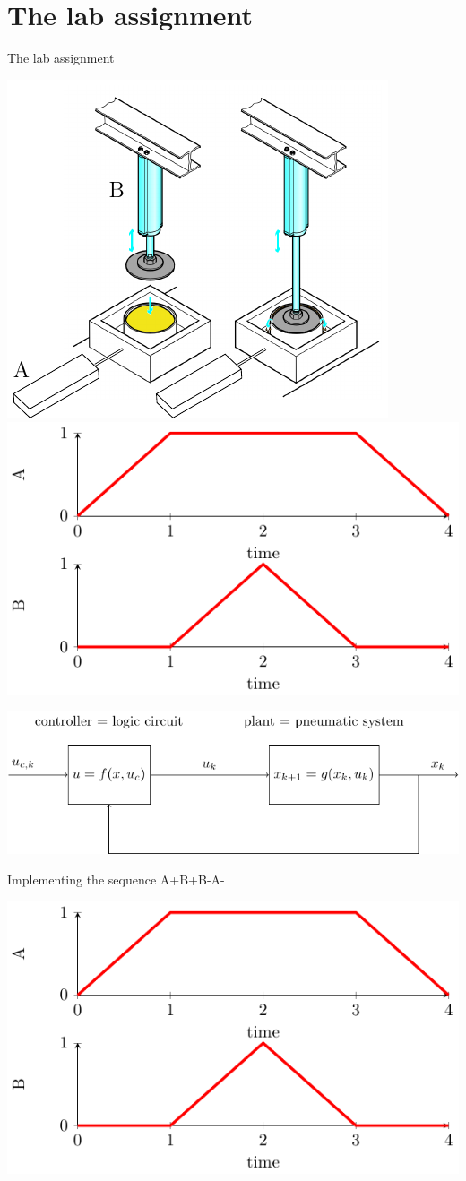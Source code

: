 \documentclass[presentation,aspectratio=1610]{beamer}
\begin{document}
\section{The lab assignment}
\label{sec:org1920cce}


\begin{frame}[label={sec:org8cd3020}]{The lab assignment}
\begin{center}
\includegraphics[width=0.4\linewidth]{../../figures/cheese-pressing-two-cylinders}
 \includegraphics[width=0.58\linewidth]{../../figures/AplusBplusBminAmin}
\end{center}

\begin{center}
\includegraphics[width=0.8\linewidth]{../../figures/logic-control-loop}
\end{center}
\end{frame}

\begin{frame}[label={sec:orgddb5b24}]{Implementing the sequence A+B+B-A-}
\begin{center}
\includegraphics[width=0.8\linewidth]{../../figures/AplusBplusBminAmin}
\end{center}
\end{frame}
\end{document}
